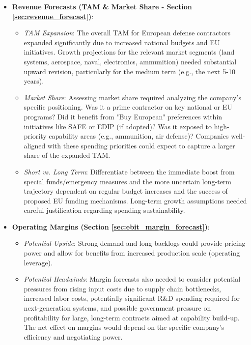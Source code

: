 \begin{itemize}
    \item \textbf{Revenue Forecasts (TAM \& Market Share - Section \ref{sec:revenue_forecast})}:
          \begin{itemize}
              \item \textit{TAM Expansion}: The overall TAM for European defense contractors expanded significantly due to increased national budgets and EU initiatives. Growth projections for the relevant market segments (land systems, aerospace, naval, electronics, ammunition) needed substantial upward revision, particularly for the medium term (e.g., the next 5-10 years).
              \item \textit{Market Share}: Assessing market share required analyzing the company's specific positioning. Was it a prime contractor on key national or EU programs? Did it benefit from "Buy European" preferences within initiatives like SAFE or EDIP (if adopted)? Was it exposed to high-priority capability areas (e.g., ammunition, air defense)? Companies well-aligned with these spending priorities could expect to capture a larger share of the expanded TAM.
              \item \textit{Short vs. Long Term}: Differentiate between the immediate boost from special funds/emergency measures and the more uncertain long-term trajectory dependent on regular budget increases and the success of proposed EU funding mechanisms. Long-term growth assumptions needed careful justification regarding spending sustainability.
          \end{itemize}

    \item \textbf{Operating Margins (Section \ref{sec:ebit_margin_forecast})}:
          \begin{itemize}
              \item \textit{Potential Upside}: Strong demand and long backlogs could provide pricing power and allow for benefits from increased production scale (operating leverage).
              \item \textit{Potential Headwinds}: Margin forecasts also needed to consider potential pressures from rising input costs due to supply chain bottlenecks, increased labor costs, potentially significant R\&D spending required for next-generation systems, and possible government pressure on profitability for large, long-term contracts aimed at capability build-up. The net effect on margins would depend on the specific company's efficiency and negotiating power.
          \end{itemize}


\end{itemize}
